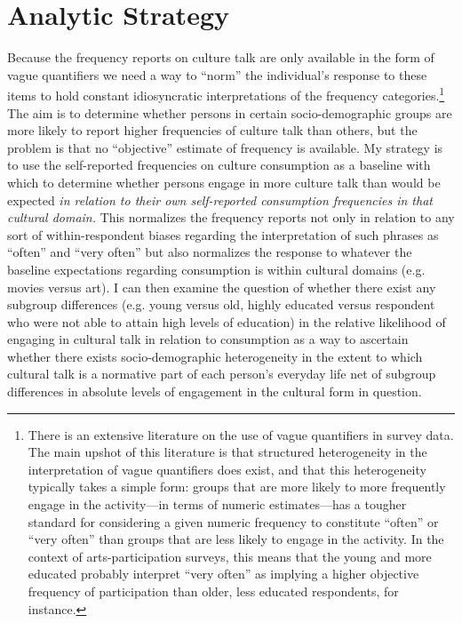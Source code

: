 \section{Analytic Strategy}
Because the frequency reports on culture talk are only available in the form of vague quantifiers we need a way to ``norm'' the individual's response to these items to hold constant idiosyncratic interpretations of the frequency categories.\footnote{There is an extensive literature on the use of vague quantifiers in survey data.  The main upshot of this literature is that structured heterogeneity in the interpretation of vague quantifiers does exist, and that this heterogeneity typically takes a simple form:  groups that are more likely to more frequently engage in the activity---in terms of numeric estimates---has a tougher standard for considering a given numeric frequency to constitute ``often'' or ``very often'' than groups that are less likely to engage in the activity.  In the context of arts-participation surveys, this means that the young and more educated probably interpret ``very often'' as implying a higher objective frequency of participation than older, less educated respondents, for instance.}  The aim is to determine whether persons in certain socio-demographic groups are more likely to report higher frequencies of culture talk than others, but the problem is that no ``objective'' estimate of frequency is available. My strategy is to use the self-reported frequencies on culture consumption as a baseline with which to determine whether persons engage in more culture talk than would be expected \emph{in relation to their own self-reported consumption frequencies in that cultural domain.} This normalizes the frequency reports not only in relation to any sort of within-respondent biases regarding the interpretation of such phrases as ``often'' and ``very often'' but also normalizes the response to whatever the baseline expectations regarding consumption is within cultural domains (e.g. movies versus art).  I can then examine the question of whether there exist any subgroup differences (e.g. young versus old, highly educated versus respondent who were not able to attain high levels of education) in the relative likelihood of engaging in cultural talk in relation to consumption as a way to ascertain whether there exists socio-demographic heterogeneity in the extent to which cultural talk is a normative part of each person's everyday life net of subgroup differences in absolute levels of engagement in the cultural form in question.

